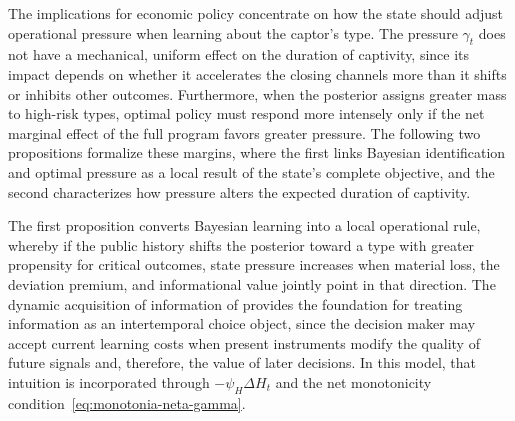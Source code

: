 \documentclass[review,authoryear,12pt]{elsarticle}
\theoremstyle{plain}
\theoremstyle{definition}
\newcommand{\1}{\mathbf{1}}
\begin{document}
\noindent The implications for economic policy concentrate on how the state should adjust operational pressure when learning about the captor's type. The pressure $\gamma_t$ does not have a mechanical, uniform effect on the duration of captivity, since its impact depends on whether it accelerates the closing channels more than it shifts or inhibits other outcomes. Furthermore, when the posterior assigns greater mass to high-risk types, optimal policy must respond more intensely only if the net marginal effect of the full program favors greater pressure. The following two propositions formalize these margins, where the first links Bayesian identification and optimal pressure as a local result of the state's complete objective, and the second characterizes how pressure alters the expected duration of captivity.

\noindent The first proposition converts Bayesian learning into a local operational rule, whereby if the public history shifts the posterior toward a type with greater propensity for critical outcomes, state pressure increases when material loss, the deviation premium, and informational value jointly point in that direction. The dynamic acquisition of information of \citet{Zhong2022} provides the foundation for treating information as an intertemporal choice object, since the decision maker may accept current learning costs when present instruments modify the quality of future signals and, therefore, the value of later decisions. In this model, that intuition is incorporated through $-\psi_H\Delta H_t$ and the net monotonicity condition~\eqref{eq:monotonia-neta-gamma}.
\end{document}
